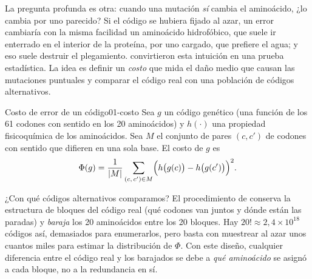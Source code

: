 La pregunta profunda es otra: cuando una mutación \emph{sí} cambia el aminoácido, ¿lo cambia por uno parecido? Si el código se hubiera fijado al azar, un error cambiaría con la misma facilidad un aminoácido hidrofóbico, que suele ir enterrado en el interior de la proteína, por uno cargado, que prefiere el agua; y eso suele destruir el plegamiento. \textcite{c01-haig1991} convirtieron esta intuición en una prueba estadística. La idea es definir un \emph{costo} que mida el daño medio que causan las mutaciones puntuales y comparar el código real con una población de códigos alternativos.

\begin{definicion}{Costo de error de un código}{01-costo}
Sea $g$ un código genético (una función de los 61 codones con sentido en los 20 aminoácidos) y $h(\cdot)$ una propiedad fisicoquímica de los aminoácidos. Sea $M$ el conjunto de pares $(c,c')$ de codones con sentido que difieren en una sola base. El costo de $g$ es
\begin{equation}\label{eq:01-costo}
\Phi(g) = \frac{1}{|M|}\sum_{(c,\,c')\in M}\Bigl(h\bigl(g(c)\bigr) - h\bigl(g(c')\bigr)\Bigr)^2 .
\end{equation}
\end{definicion}

\begin{simbolos}
\end{simbolos}

¿Con qué códigos alternativos comparamos? El procedimiento de \textcite{c01-haig1991} conserva la estructura de bloques del código real (qué codones van juntos y dónde están las paradas) y \emph{baraja} los 20 aminoácidos entre los 20 bloques. Hay $20!\approx 2{,}4\times10^{18}$ códigos así, demasiados para enumerarlos, pero basta con muestrear al azar unos cuantos miles para estimar la distribución de $\Phi$. Con este diseño, cualquier diferencia entre el código real y los barajados se debe a \emph{qué aminoácido} se asignó a cada bloque, no a la redundancia en sí.

